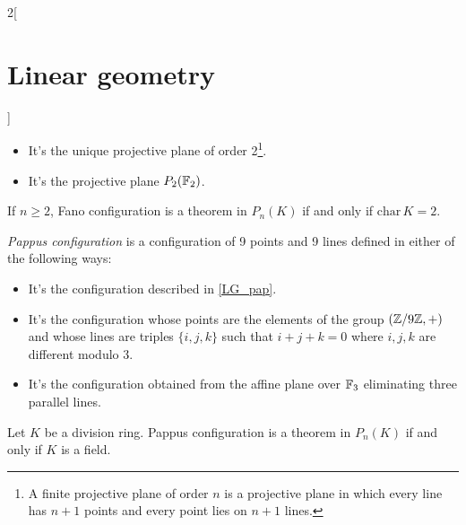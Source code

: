 \documentclass[../../../main_math.tex]{subfiles}
\begin{document}
\begin{multicols}{2}[\section{Linear geometry}]
\begin{definition}
\begin{itemize}
\begin{center}
            \end{center}
      \item It's the unique projective plane of order 2\footnote{A finite projective plane of order $n$ is a  projective plane in which every line has $n+1$ points and every point lies on $n+1$ lines.}.
      \item It's the projective plane $P_2(\mathbb{F}_2)$.
    \end{itemize}
  \end{definition}
  \begin{theorem}
    If $n\geq 2$, Fano configuration is a theorem in $P_n(K)$ if and only if $\text{char}\,K=2$.
  \end{theorem}
  \begin{definition}
    \emph{Pappus configuration} is a configuration of 9 points and 9 lines defined in either of the following ways:
    \begin{itemize}
      \item It's the configuration described in \cref{LG_pap}.
            \begin{center}
              \begin{minipage}{\linewidth}
                \centering
                
                \label{LG_pap}
              \end{minipage}
            \end{center}
      \item It's the configuration whose points are the elements of the group $(\mathbb{Z} /9\mathbb{Z} ,+)$ and whose lines are triples $\{i,j,k\}$ such that $i+j+k=0$ where $i,j,k$ are different modulo 3.
      \item It's the configuration obtained from the affine plane over $\mathbb{F}_3$ eliminating three parallel lines.
    \end{itemize}
  \end{definition}
  \begin{theorem}
    Let $K$ be a division ring. Pappus configuration is a theorem in $P_n(K)$ if and only if $K$ is a field.
  \end{theorem}

\end{multicols}
\end{document}
